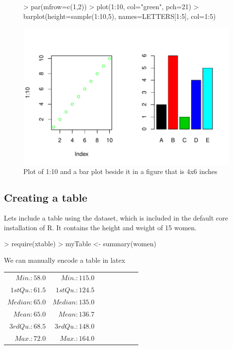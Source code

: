 \documentclass{article}
\begin{document}
\begin{figure}
\begin{Schunk}
\begin{Sinput}
> par(mfrow=c(1,2))
> plot(1:10, col="green", pch=21)
> barplot(height=sample(1:10,5), names=LETTERS[1:5], col=1:5)
\end{Sinput}
\end{Schunk}
\includegraphics{Fig-test3}

\caption{Plot of 1:10 and a bar plot beside it in a figure that is 4x6 inches}

\end{figure}

\newpage
\subsection{Creating a table}

Lets include a table using the dataset,  which is included in the default core installation of R. It contains the height and weight of 15 women.

\begin{Schunk}
\begin{Sinput}
> require(xtable)
> myTable <- summary(women)
\end{Sinput}
\end{Schunk}

We can manually encode a table in latex 


\begin{center}
\begin{tabular}{rrrrrrrr} 

$ Min.   :58.0   $&$ Min.   :115.0   $\\
$ 1st Qu.:61.5   $&$ 1st Qu.:124.5   $\\
$ Median :65.0   $&$ Median :135.0   $\\
$ Mean   :65.0   $&$ Mean   :136.7   $\\
$ 3rd Qu.:68.5   $&$ 3rd Qu.:148.0   $\\
$ Max.   :72.0   $&$ Max.   :164.0   $\\\end{tabular}
\end{center}
\end{document}
